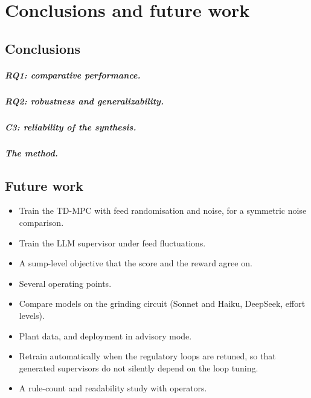 \chapter{Conclusions and future work}
\label{ch:conclusions}

\section{Conclusions}
\label{sec:conclusions}
\paragraph{RQ1: comparative performance.}

\paragraph{RQ2: robustness and generalizability.}

\paragraph{C3: reliability of the synthesis.}

\paragraph{The method.}

\section{Future work}
\label{sec:future-work}
\begin{itemize}
\item Train the TD-MPC with feed randomisation and noise, for a symmetric
  noise comparison.
\item Train the LLM supervisor under feed fluctuations.
\item A sump-level objective that the score and the reward agree on.
\item Several operating points.
\item Compare models on the grinding circuit (Sonnet and Haiku, DeepSeek,
  effort levels).
\item Plant data, and deployment in advisory mode.
\item Retrain automatically when the regulatory loops are retuned, so that
  generated supervisors do not silently depend on the loop tuning.
\item A rule-count and readability study with operators.
\end{itemize}
